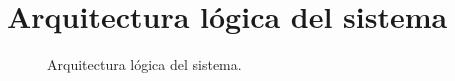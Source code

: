 \section{Arquitectura lógica del sistema}

\begin{figure}[htbp!]
	\centering
	\caption{Arquitectura lógica del sistema.}
	\label{fig:ArquitecturaLogica}
	\end{figure}